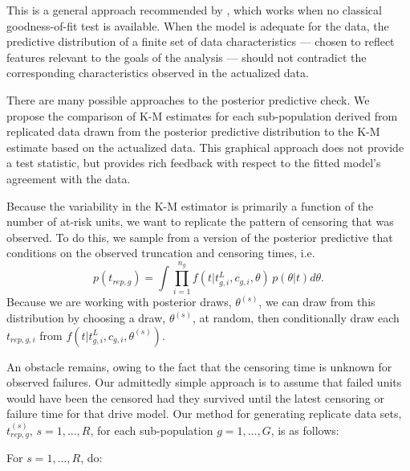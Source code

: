\documentclass[12pt]{article}
\begin{document}
This is a general approach recommended by \cite{gelman1996postpred}, which works when no classical goodness-of-fit test is available. When the model is adequate for the data, the predictive distribution of a finite set of data characteristics --- chosen to reflect features relevant to the goals of the analysis --- should not contradict the corresponding characteristics observed in the actualized data.

There are many possible approaches to the posterior predictive check. We propose the comparison of K-M estimates for each sub-population derived from replicated data drawn from the posterior predictive distribution to the K-M estimate based on the actualized data. This graphical approach does not provide a test statistic, but provides rich feedback with respect to the fitted model's agreement with the data.

Because the variability in the K-M estimator is primarily a function of the number of at-risk units, we want to replicate the pattern of censoring that was observed. To do this, we sample from a version of the posterior predictive that conditions on the observed truncation and censoring times, i.e. 
$$p(t_{rep,g}) = \int \prod_{i=1}^{n_g}f(t|t_{g,i}^L,c_{g,i},\theta)\,p(\theta|t)d\theta.$$
Because we are working with posterior draws, $\theta^{(s)}$, we can draw from this distribution by choosing a draw, $\theta^{(s)}$, at random, then conditionally draw each $t_{rep,g,i}$ from $f(t|t_{g,i}^L,c_{g,i},\theta^{(s)}).$

An obstacle remains, owing to the fact that the censoring time is unknown for observed failures. Our admittedly simple approach is to assume that failed units would have been the censored had they survived until the latest censoring or failure time for that drive model. Our method for generating replicate data sets, $t_{rep,g}^{(s)}$, $s = 1,\ldots, R$, for each sub-population $g=1,\ldots,G$, is as follows:

For $s=1,\ldots, R$, do:
\end{document}
